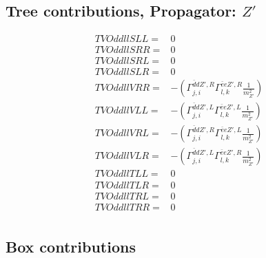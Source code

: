\documentclass[A4,landscape]{article}
\begin{document}
\subsection{Tree contributions, Propagator: ${Z'}$} 

\begin{align} 
  TVOddllSLL= & 0 \\ 
  TVOddllSRR= & 0 \\ 
  TVOddllSRL= & 0 \\ 
  TVOddllSLR= & 0 \\ 
  TVOddllVRR= & -(\Gamma^{\bar{d}d {Z'} ,R}_{j, i} \Gamma^{\bar{e}e {Z'} ,R}_{l, k} \frac{1}{m^2_{{Z'}}}) \\ 
  TVOddllVLL= & -(\Gamma^{\bar{d}d {Z'} ,L}_{j, i} \Gamma^{\bar{e}e {Z'} ,L}_{l, k} \frac{1}{m^2_{{Z'}}}) \\ 
  TVOddllVRL= & -(\Gamma^{\bar{d}d {Z'} ,R}_{j, i} \Gamma^{\bar{e}e {Z'} ,L}_{l, k} \frac{1}{m^2_{{Z'}}}) \\ 
  TVOddllVLR= & -(\Gamma^{\bar{d}d {Z'} ,L}_{j, i} \Gamma^{\bar{e}e {Z'} ,R}_{l, k} \frac{1}{m^2_{{Z'}}}) \\ 
  TVOddllTLL= & 0 \\ 
  TVOddllTLR= & 0 \\ 
  TVOddllTRL= & 0 \\ 
  TVOddllTRR= & 0 \\ 
\end{align} 
\subsection{Box contributions} 
\end{document}
